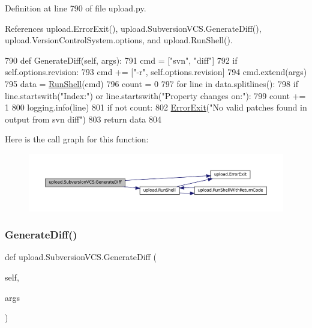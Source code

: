 Definition at line 790 of file upload.\+py.



References upload.\+Error\+Exit(), upload.\+Subversion\+V\+C\+S.\+Generate\+Diff(), upload.\+Version\+Control\+System.\+options, and upload.\+Run\+Shell().


\begin{DoxyCode}
790   \textcolor{keyword}{def }GenerateDiff(self, args):
791     cmd = [\textcolor{stringliteral}{"svn"}, \textcolor{stringliteral}{"diff"}]
792     \textcolor{keywordflow}{if} self.options.revision:
793       cmd += [\textcolor{stringliteral}{"-r"}, self.options.revision]
794     cmd.extend(args)
795     data = \hyperlink{namespaceupload_adddc423c49132e8879cbb25d6be2cf11}{RunShell}(cmd)
796     count = 0
797     \textcolor{keywordflow}{for} line \textcolor{keywordflow}{in} data.splitlines():
798       \textcolor{keywordflow}{if} line.startswith(\textcolor{stringliteral}{"Index:"}) \textcolor{keywordflow}{or} line.startswith(\textcolor{stringliteral}{"Property changes on:"}):
799         count += 1
800         logging.info(line)
801     \textcolor{keywordflow}{if} \textcolor{keywordflow}{not} count:
802       \hyperlink{namespaceupload_adea53186a1d73e92cc839b7c35c2c044}{ErrorExit}(\textcolor{stringliteral}{"No valid patches found in output from svn diff"})
803     \textcolor{keywordflow}{return} data
804 
\end{DoxyCode}
Here is the call graph for this function\+:
\nopagebreak
\begin{figure}[H]
\begin{center}
\leavevmode
\includegraphics[width=350pt]{classupload_1_1SubversionVCS_a07c2d341f2c7df2772dd7f85e89b0212_cgraph}
\end{center}
\end{figure}
\mbox{\label{classupload_1_1SubversionVCS_a07c2d341f2c7df2772dd7f85e89b0212}} 
\subsubsection{\texorpdfstring{Generate\+Diff()}{GenerateDiff()}\hspace{0.1cm}{\footnotesize\ttfamily [2/2]}}
{\footnotesize\ttfamily def upload.\+Subversion\+V\+C\+S.\+Generate\+Diff (\begin{DoxyParamCaption}\item[{}]{self,  }\item[{}]{args }\end{DoxyParamCaption})}



